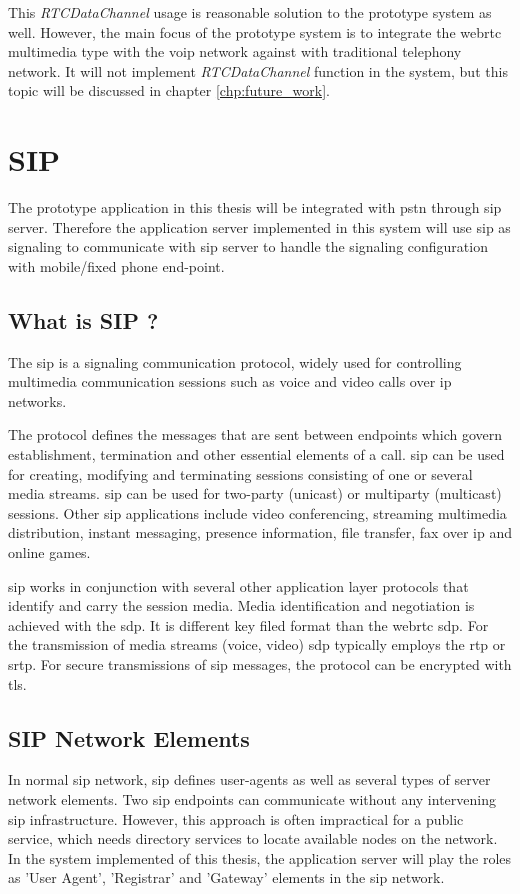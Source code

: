 \par This \textit{RTCDataChannel} usage is reasonable solution to the prototype system as well. However, the main focus of the prototype system is to integrate the \gls{webrtc} multimedia type with the \gls{voip} network against with traditional telephony network. It will not implement \textit{RTCDataChannel} function in the system, but this topic will be discussed in chapter \ref{chp:future_work}.

\section{SIP}
\noindent The prototype application in this thesis will be integrated with \gls{pstn} through \gls{sip} server. Therefore the application server implemented in this system will use \gls{sip} as signaling to communicate with \gls{sip} server to handle the signaling configuration with mobile/fixed phone end-point.

\subsection{What is SIP ?}
\noindent The \gls{sip} is a signaling communication protocol, widely used for controlling multimedia communication sessions such as voice and video calls over \gls{ip} networks.

\par The protocol defines the messages that are sent between endpoints which govern establishment, termination and other essential elements of a call. \gls{sip} can be used for creating, modifying and terminating sessions consisting of one or several media streams. \gls{sip} can be used for two-party (unicast) or multiparty (multicast) sessions. Other \gls{sip} applications include video conferencing, streaming multimedia distribution, instant messaging, presence information, file transfer, fax over \gls{ip} and online games.\cite{wiki:sip}

\par \gls{sip} works in conjunction with several other application layer protocols that identify and carry the session media. Media identification and negotiation is achieved with the \gls{sdp}. It is different key filed format than the \gls{webrtc} \gls{sdp}. For the transmission of media streams (voice, video) \gls{sdp} typically employs the \gls{rtp} or \gls{srtp}. For secure transmissions of \gls{sip} messages, the protocol can be encrypted with \gls{tls}.

\subsection{SIP Network Elements}
\noindent In normal \gls{sip} network, \gls{sip} defines user-agents as well as several types of server network elements. Two \gls{sip} endpoints can communicate without any intervening \gls{sip} infrastructure. However, this approach is often impractical for a public service, which needs directory services to locate available nodes on the network. In the system implemented of this thesis, the application server will play the roles as 'User Agent', 'Registrar' and 'Gateway' elements in the \gls{sip} network.

